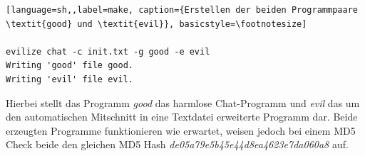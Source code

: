 \documentclass[12pt]{article}
\begin{document}
\begin{lstlisting}[language=sh,,label=make, caption={Erstellen der beiden Programmpaare \textit{good} und \textit{evil}}, basicstyle=\footnotesize]

evilize chat -c init.txt -g good -e evil
Writing 'good' file good.
Writing 'evil' file evil.

\end{lstlisting}

Hierbei stellt das  Programm \textit{good} das harmlose Chat-Programm und \textit{evil} das um den automatischen Mitschnitt in eine Textdatei erweiterte Programm dar. Beide erzeugten Programme funktionieren wie erwartet, weisen jedoch bei einem MD5 Check beide den gleichen MD5 Hash  \textit{de05a79e5b45e44d8ea4623e7da060a8} auf.
\end{document}
